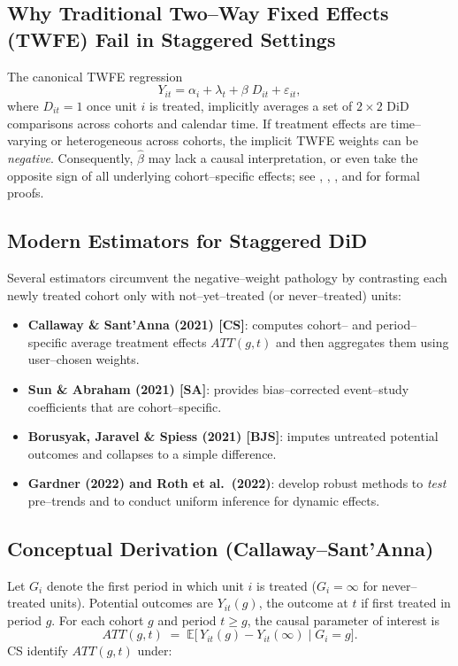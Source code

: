 \subsection{Why Traditional Two--Way Fixed Effects (TWFE) Fail in Staggered Settings}
The canonical TWFE regression
\[
  Y_{it} = \alpha_i + \lambda_t + \beta\;D_{it} + \varepsilon_{it},
\]
where $D_{it}=1$ once unit $i$ is treated, implicitly averages a set of $2\times 2$ DiD comparisons across cohorts and calendar time.  
If treatment effects are time--varying or heterogeneous across cohorts, the implicit TWFE weights can be \emph{negative}.  
Consequently, $\widehat{\beta}$ may lack a causal interpretation, or even take the opposite sign of all underlying cohort--specific effects; see
\cite{goodman-bacon2021difference},
\cite{callaway2021difference},
\cite{sun2021estimating},
and \cite{borusyak2021revisiting} for formal proofs.

\subsection{Modern Estimators for Staggered DiD}
Several estimators circumvent the negative--weight pathology by contrasting each newly treated cohort only with not--yet--treated (or never--treated) units:

\begin{itemize}
  \item \textbf{Callaway \& Sant'Anna (2021) [CS]}: computes cohort-- and period--specific average treatment effects $ATT(g,t)$ and then aggregates them using user--chosen weights.
  \item \textbf{Sun \& Abraham (2021) [SA]}: provides bias--corrected event--study coefficients that are cohort--specific.
  \item \textbf{Borusyak, Jaravel \& Spiess (2021) [BJS]}: imputes untreated potential outcomes and collapses to a simple difference.
  \item \textbf{Gardner (2022) and Roth et al.\ (2022)}: develop robust methods to \emph{test} pre--trends and to conduct uniform inference for dynamic effects.
\end{itemize}

\subsection{Conceptual Derivation (Callaway--Sant'Anna)}
Let $G_i$ denote the first period in which unit $i$ is treated ($G_i=\infty$ for never--treated units).  
Potential outcomes are $Y_{it}(g)$, the outcome at $t$ if first treated in period $g$.  
For each cohort $g$ and period $t\ge g$, the causal parameter of interest is
\[
  ATT(g,t)\;=\;\mathbb{E}\!\bigl[\,Y_{it}(g)-Y_{it}(\infty)\;\big|\;G_i=g \bigr].
\]
CS identify $ATT(g,t)$ under:

